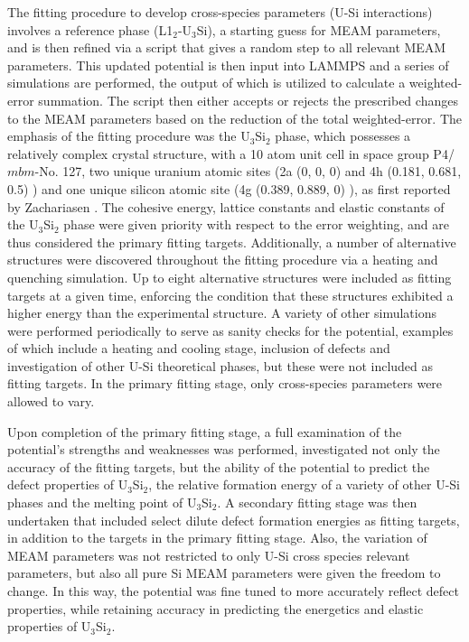 \documentclass[review]{elsarticle}
\begin{document}
The fitting procedure to develop cross-species parameters (U-Si interactions) involves a reference phase (L1$_{2}$-U$_{3}$Si), a starting guess for MEAM parameters, and is then refined via a script that gives a random step to all relevant MEAM parameters.  This updated potential is then input into LAMMPS \cite{plimpton1995} and a series of simulations are performed, the output of which is utilized to calculate a weighted-error summation.  The script then either accepts or rejects the prescribed changes to the MEAM parameters based on the reduction of the total weighted-error.  The emphasis of the fitting procedure was the U$_{3}$Si$_{2}$ phase, which possesses a relatively complex crystal structure, with a 10 atom unit cell in space group P4/$\textit{mbm}$-No. 127, two unique uranium atomic sites (2a (0, 0, 0) and 4h (0.181, 0.681, 0.5) ) and one unique silicon atomic site (4g (0.389, 0.889, 0) ), as first reported by Zachariasen \cite{zachariasen1949}.  The cohesive energy, lattice constants and elastic constants of the U$_{3}$Si$_{2}$ phase were given priority with respect to the error weighting, and are thus considered the primary fitting targets.  Additionally, a number of alternative structures were discovered throughout the fitting procedure via a heating and quenching simulation.  Up to eight alternative structures were included as fitting targets at a given time, enforcing the condition that these structures exhibited a higher energy than the experimental structure.  A variety of other simulations were performed periodically to serve as sanity checks for the potential, examples of which include a heating and cooling stage, inclusion of defects and investigation of other U-Si theoretical phases, but these were not included as fitting targets.  In the primary fitting stage, only cross-species parameters were allowed to vary.  

Upon completion of the primary fitting stage, a full examination of the potential's strengths and weaknesses was performed, investigated not only the accuracy of the fitting targets, but the ability of the potential to predict the defect properties of U$_{3}$Si$_{2}$, the relative formation energy of a variety of other U-Si phases and the melting point of U$_{3}$Si$_{2}$.  A secondary fitting stage was then undertaken that included select dilute defect formation energies as fitting targets, in addition to the targets in the primary fitting stage.  Also, the variation of MEAM parameters was not restricted to only U-Si cross species relevant parameters, but also all pure Si MEAM parameters were given the freedom to change.  In this way, the potential was fine tuned to more accurately reflect defect properties, while retaining accuracy in predicting the energetics and elastic properties of U$_{3}$Si$_{2}$.  
\end{document}
